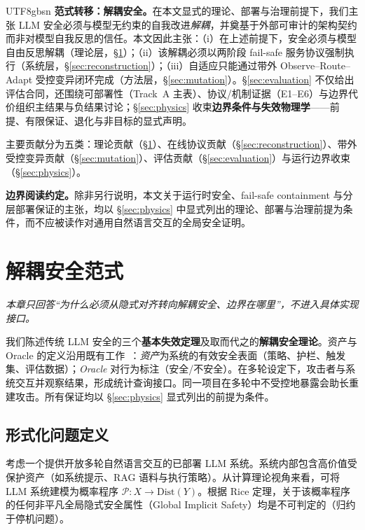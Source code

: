 \documentclass[letterpaper,twocolumn,10pt]{article}
\begin{document}
\begin{CJK}{UTF8}{gbsn}
\textbf{范式转移：解耦安全。}在本文显式的理论、部署与治理前提下，我们主张 LLM 安全必须与模型无约束的自我改进\emph{解耦}，并奠基于外部可审计的架构契约而非对模型自我反思的信任。本文因此主张：（i）在上述前提下，安全必须与模型自由反思解耦（理论层，\S\ref{sec:paradigm}）；（ii）该解耦必须以两阶段 fail-safe 服务协议强制执行（系统层，\S\ref{sec:reconstruction}）；（iii）自适应只能通过带外 Observe--Route--Adapt 受控变异闭环完成（方法层，\S\ref{sec:mutation}）。\S\ref{sec:evaluation} 不仅给出评估合同，还围绕可部署性（Track~A 主表）、协议/机制证据（E1--E6）与边界代价组织主结果与负结果讨论；\S\ref{sec:physics} 收束\textbf{边界条件与失效物理学}——前提、有限保证、退化与非目标的显式声明。

主要贡献分为五类：理论贡献（\S\ref{sec:paradigm}）、在线协议贡献（\S\ref{sec:reconstruction}）、带外受控变异贡献（\S\ref{sec:mutation}）、评估贡献（\S\ref{sec:evaluation}）与运行边界收束（\S\ref{sec:physics}）。

\noindent\textbf{边界阅读约定。}除非另行说明，本文关于运行时安全、fail-safe containment 与分层部署保证的主张，均以 \S\ref{sec:physics} 中显式列出的理论、部署与治理前提为条件，而不应被读作对通用自然语言交互的全局安全证明。

\section{解耦安全范式}
\label{sec:paradigm}

\noindent\textit{本章只回答``为什么必须从隐式对齐转向解耦安全、边界在哪里''，不进入具体实现接口。}

我们陈述传统 LLM 安全的三个\textbf{基本失效定理}及取而代之的\textbf{解耦安全理论}。资产与 Oracle 的定义沿用既有工作~\cite{llm-reconstruction-emergent,ControlledMutation_SafetyEval}：\emph{资产}为系统的有效安全表面（策略、护栏、触发集、评估数据）；\emph{Oracle} 对行为标注（安全/不安全）。在多轮设定下，攻击者与系统交互并观察结果，形成统计查询接口。同一项目在多轮中不受控地暴露会助长重建攻击。所有保证均以 \S\ref{sec:physics} 显式列出的前提为条件。

\subsection{形式化问题定义}
\label{sec:problem-statement}

考虑一个提供开放多轮自然语言交互的已部署 LLM 系统。系统内部包含高价值受保护资产（如系统提示、RAG 语料与执行策略）。从计算理论视角来看，可将 LLM 系统建模为概率程序 $\mathcal{P}: X \to \mathrm{Dist}(Y)$。根据 Rice 定理，关于该概率程序的任何非平凡全局隐式安全属性（Global Implicit Safety）均是不可判定的（归约于停机问题）。


\end{CJK}
\end{document}

